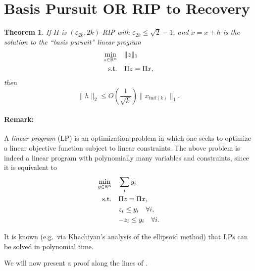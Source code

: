 \documentclass[11pt]{article}
\newcommand{\eps}{\varepsilon}
\newcommand{\R}{\mathbb{R}}
\newtheorem{theorem}{Theorem}
\begin{document}


\section{Basis Pursuit OR RIP to Recovery}

\begin{theorem}
If $\Pi$ is $(\eps_{2k}, 2k)$-RIP with $\eps_{2k} \le \sqrt{2} - 1$, 
and $\tilde{x} = x+ h$ is the solution to the ``basis pursuit'' 
linear program
	\begin{align*}
		\min_{z \in \R^n} &\quad\|z\|_1 \\
		\textnormal{s.t.} &\quad\Pi z = \Pi x,
	\end{align*}
	then
	$$
	\|h\|_2 \le O\left(\frac{1}{\sqrt{k}}\right) \|x_{tail(k)}\|_1.
	$$
\end{theorem}

\paragraph{Remark:} A \emph{linear program} (LP) is an optimization 
problem in 
which one seeks to optimize a linear objective function subject to 
linear 
constraints. The above problem is indeed a linear program with 
polynomially 
many variables and constraints, since it is equivalent to
\begin{align*}
	\min_{y \in \R^n} &\quad\sum_{i} y_i \\
	\textnormal{s.t.} &\quad\Pi z = \Pi x, \\
	&\quad z_i \le y_i \quad\forall i, \\
	&\quad {-z_i} \le y_i \quad\forall i.
\end{align*}

It is known (e.g.\ via Khachiyan's analysis of the ellipsoid method) 
that LPs 
can be solved in polynomial time.

We will now present a proof along the lines of \cite{Candes08}.
\end{document}

